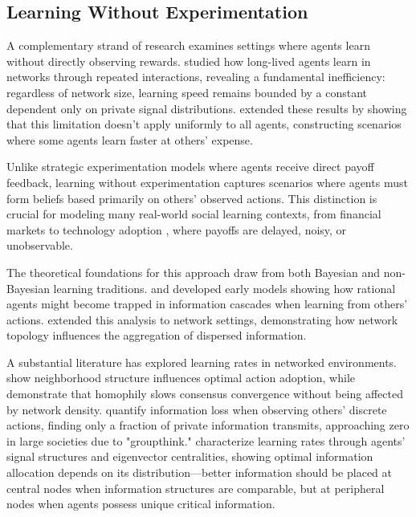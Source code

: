 \subsection{Learning Without Experimentation}

A complementary strand of research examines settings where agents learn without directly observing rewards. \citet{huang2024learning} studied how long-lived agents learn in networks through repeated interactions, revealing a fundamental inefficiency: regardless of network size, learning speed remains bounded by a constant dependent only on private signal distributions. \citet{brandl2024} extended these results by showing that this limitation doesn't apply uniformly to all agents, constructing scenarios where some agents learn faster at others' expense.

Unlike strategic experimentation models where agents receive direct payoff feedback, learning without experimentation captures scenarios where agents must form beliefs based primarily on others' observed actions. This distinction is crucial for modeling many real-world social learning contexts, from financial markets \citep{avery1998multidimensional} to technology adoption \citep{ellison1993rules}, where payoffs are delayed, noisy, or unobservable.

The theoretical foundations for this approach draw from both Bayesian and non-Bayesian learning traditions. \citet{gale2003bayesian} and \citet{smith2000pathological} developed early models showing how rational agents might become trapped in information cascades when learning from others' actions. \citet{acemoglu2011bayesian} extended this analysis to network settings, demonstrating how network topology influences the aggregation of dispersed information.

A substantial literature has explored learning rates in networked environments. \cite{bala1998learning} show neighborhood structure influences optimal action adoption, while \cite{golub2012homophily} demonstrate that homophily slows consensus convergence without being affected by network density. \cite{Harel2014TheSO} quantify information loss when observing others' discrete actions, finding only a fraction of private information transmits, approaching zero in large societies due to "groupthink." \cite{Jadbabaie2013InformationHA} characterize learning rates through agents' signal structures and eigenvector centralities, showing optimal information allocation depends on its distribution—better information should be placed at central nodes when information structures are comparable, but at peripheral nodes when agents possess unique critical information.

